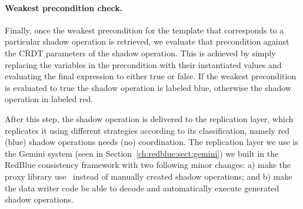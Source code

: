\fi
\noindent\paragraph{Weakest precondition check.} Finally, once the weakest precondition for the template that corresponds to
a particular shadow operation is retrieved, we evaluate that precondition
against the CRDT parameters of the shadow operation. This is achieved by simply
replacing the variables in the precondition with their instantiated values and
evaluating the final expression to either true or false. If the weakest
precondition is evaluated to true the shadow operation is labeled blue,
otherwise the shadow operation in labeled red.

After this step, the shadow operation is delivered to the replication layer,
which replicates it using different strategies according to its classification,
namely red (blue) shadow operations needs (no) coordination. The replication layer
we use is the Gemini system (seen in Section~\ref{ch:redblue:sect:gemini}) we built in the RedBlue consistency framework with two following minor changes:
a) make the proxy library use \tool\ instead of manually created shadow operations;
and b) make the data writer code be able to decode and automatically execute generated shadow operations.



